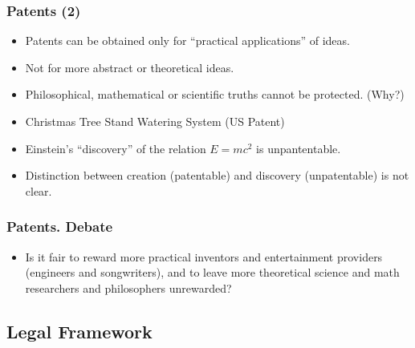 \begin{frame}
\frametitle{Patents (2)}

\begin{itemize}

\item Patents can be obtained only for ``practical applications'' of ideas.
\item Not for more abstract or theoretical ideas.
\item Philosophical, mathematical or scientific truths cannot be protected. (Why?)
\item Christmas Tree Stand Watering System (US Patent)
\item Einstein's ``discovery'' of the relation $E=mc^2$ is unpantentable.
\item Distinction between \alert{creation} (patentable) and \alert{discovery} (unpatentable) is not clear.
\end{itemize}

\end{frame}



\begin{frame}
\frametitle{Patents. Debate}

\begin{itemize}
\item Is it fair to reward more \alert{practical inventors} and entertainment providers (engineers and songwriters), and to leave 
  more \alert{theoretical science} and \alert{math researchers} and \alert{philosophers} unrewarded?


\end{itemize}

\end{frame}



\subsection{Legal Framework}

